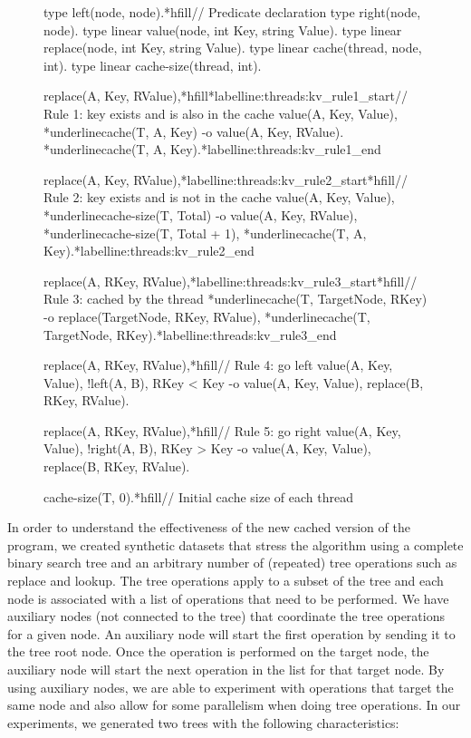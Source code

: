 \begin{figure}[ht]
\begin{LineCode}[commandchars=*\{\}]
type left(node, node).*hfill// Predicate declaration
type right(node, node).
type linear value(node, int Key, string Value).
type linear replace(node, int Key, string Value).
type linear cache(thread, node, int).
type linear cache-size(thread, int).

replace(A, Key, RValue),*hfill*label{line:threads:kv_rule1_start}// Rule 1: key exists and is also in the cache
value(A, Key, Value),
*underline{cache(T, A, Key)}
   -o value(A, Key, RValue).
      *underline{cache(T, A, Key)}.*label{line:threads:kv_rule1_end}

replace(A, Key, RValue),*label{line:threads:kv_rule2_start}*hfill// Rule 2: key exists and is not in the cache
value(A, Key, Value),
*underline{cache-size(T, Total)}
   -o value(A, Key, RValue),
      *underline{cache-size(T, Total + 1)},
      *underline{cache(T, A, Key)}.*label{line:threads:kv_rule2_end}

replace(A, RKey, RValue),*label{line:threads:kv_rule3_start}*hfill// Rule 3: cached by the thread
*underline{cache(T, TargetNode, RKey)}
   -o replace(TargetNode, RKey, RValue),
      *underline{cache(T, TargetNode, RKey)}.*label{line:threads:kv_rule3_end}

replace(A, RKey, RValue),*hfill// Rule 4: go left
value(A, Key, Value),
!left(A, B),
RKey < Key
   -o value(A, Key, Value),
      replace(B, RKey, RValue).

replace(A, RKey, RValue),*hfill// Rule 5: go right
value(A, Key, Value),
!right(A, B),
RKey > Key
   -o value(A, Key, Value),
      replace(B, RKey, RValue).

cache-size(T, 0).*hfill// Initial cache size of each thread
\end{LineCode}
\label{code:threads:btree_lookup_cache}
\end{figure}

In order to understand the effectiveness of the new cached version of the
program, we created synthetic datasets that stress the algorithm using a
complete binary search tree and an arbitrary number of (repeated) tree
operations such as replace and lookup. The tree operations apply to a subset of
the tree and each node is associated with a list of operations that need to be
performed. We have auxiliary nodes (not connected to the tree) that coordinate
the tree operations for a given node. An auxiliary node will start the first
operation by sending it to the tree root node. Once the operation is performed
on the target node, the auxiliary node will start the next operation in the list
for that target node. By using auxiliary nodes, we are able to experiment with
operations that target the same node and also allow for some parallelism when
doing tree operations. In our experiments, we generated two trees with the
following characteristics:

